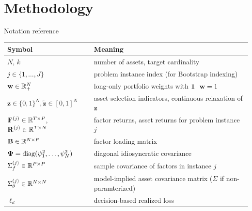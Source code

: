 \documentclass[10pt,aspectratio=169]{beamer}
\newcommand{\Nassets}{N}
\newcommand{\Kcard}{k}
\newcommand{\Param}{\theta}
\newcommand{\SigmaMat}{\Sigma}
\begin{document}


\section{Methodology}

\begin{frame}{Notation reference}
  \centering\small
  \begin{tabular}{>{\raggedright\arraybackslash}p{.28\linewidth}p{.65\linewidth}}
    
    \toprule
    Symbol & Meaning \\
    \midrule
    $\Nassets$, $\Kcard$ & number of assets, target cardinality \\
    $j \in \{1,\dots, J\}$ & problem instance index (for Bootstrap indexing) \\
    $\mathbf{w}\in\RR_+^\Nassets$ & long-only portfolio weights with $\mathbf{1}^\top \mathbf{w}=1$ \\
    $\mathbf{z}\in\{0,1\}^\Nassets, \tilde{\mathbf{{z}}} \in [0,1]^\Nassets$ & asset-selection indicators, continuous relaxation of $\mathbf{z}$ \\
    $\mathbf{F}^{(j)} \in \mathbb{R}^{T \times P}$, $\mathbf{R}^{(j)} \in \RR^{T \times \Nassets}$ & factor returns, asset returns for problem instance $j$ \\
    $\mathbf{B}\in\RR^{\Nassets\times P}$ & factor loading matrix \\
    $\boldsymbol{\Psi}=\diag(\psi_1^2,\dots,\psi_\Nassets^2)$ & diagonal idiosyncratic covariance \\
    $\SigmaMat_f^{(j)} \in \RR^{P\times P}$ & sample covariance of factors in instance $j$ \\
    $\SigmaMat_\Param^{(j)} \in \RR^{\Nassets\times \Nassets}$ & model-implied asset covariance matrix ($\SigmaMat$ if non-paramterized) \\
    $\ell_d$ & decision-based realized loss \\
    \bottomrule
  \end{tabular}
\end{frame}
\end{document}

